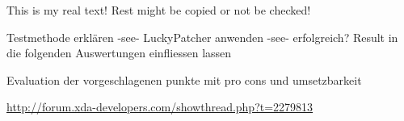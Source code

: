 This is my real text! Rest might be copied or not be checked!

Testmethode erklären -see- LuckyPatcher anwenden -see- erfolgreich?\newline
Result in die folgenden Auswertungen einfliessen lassen\newline


Evaluation der vorgeschlagenen punkte mit pro cons und umsetzbarkeit\newline

\url{http://forum.xda-developers.com/showthread.php?t=2279813}\newline
